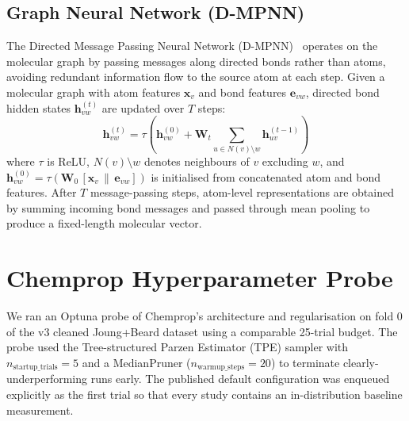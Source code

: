 \documentclass[journal=jcisd8,manuscript=suppinfo]{achemso}
\newcommand{\vect}[1]{\mathbf{#1}}
\newcommand{\matr}[1]{\mathbf{#1}}
\begin{document}
\subsection*{Graph Neural Network (D-MPNN)}

The Directed Message Passing Neural Network (D-MPNN)~\cite{yangAnalyzingLearnedMolecular2019} operates on the molecular graph by passing messages along directed bonds rather than atoms, avoiding redundant information flow to the source atom at each step. Given a molecular graph with atom features $\vect{x}_v$ and bond features $\vect{e}_{vw}$, directed bond hidden states $\vect{h}_{vw}^{(t)}$ are updated over $T$ steps:
\begin{equation}
 \vect{h}_{vw}^{(t)} = \tau\!\left(\vect{h}_{vw}^{(0)} + \matr{W}_t \sum_{u \in N(v) \setminus w} \vect{h}_{uv}^{(t-1)}\right)
 \label{eq:si_dmpnn}
\end{equation}
where $\tau$ is ReLU, $N(v) \setminus w$ denotes neighbours of $v$ excluding $w$, and $\vect{h}_{vw}^{(0)} = \tau(\matr{W}_0 \, [\vect{x}_v \,\|\, \vect{e}_{vw}])$ is initialised from concatenated atom and bond features. After $T$ message-passing steps, atom-level representations are obtained by summing incoming bond messages and passed through mean pooling to produce a fixed-length molecular vector.


\section{Chemprop Hyperparameter Probe}
\label{si:chemprop_hpo}

We ran an Optuna probe of Chemprop's architecture and regularisation on fold 0 of the v3 cleaned Joung+Beard dataset using a comparable 25-trial budget. The probe used the Tree-structured Parzen Estimator (TPE) sampler with $n_{\text{startup\_trials}} = 5$ and a MedianPruner ($n_{\text{warmup\_steps}} = 20$) to terminate clearly-underperforming runs early. The published default configuration was enqueued explicitly as the first trial so that every study contains an in-distribution baseline measurement.
\end{document}
